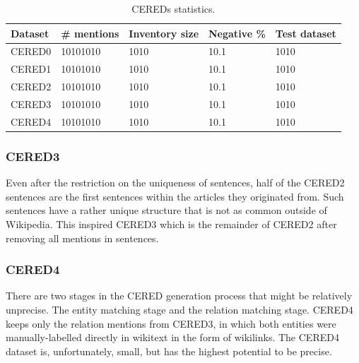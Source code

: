 \begin{table}

\caption{CEREDs statistics.}

\label{table01:S10T8}

\begin{tabular}{p{} P{2,3cm} P{2,3cm} P{2,3cm} P{2,3cm} }

\hline
Dataset & \# mentions & Inventory size & Negative \% & Test dataset\\
\hline
\hline
CERED0 & 10101010 & 1010 & 10.1 & 1010\\
CERED1 & 10101010 & 1010 & 10.1 & 1010\\
CERED2 & 10101010 & 1010 & 10.1 & 1010\\
CERED3 & 10101010 & 1010 & 10.1 & 1010\\
CERED4 & 10101010 & 1010 & 10.1 & 1010\\
\hline


\end{tabular}

\end{table}

 





\subsubsection{CERED3}
Even after the restriction on the uniqueness of sentences, half of the CERED2 sentences are the first sentences within the articles they originated from. Such sentences have a rather unique structure that is not as common outside of Wikipedia. This inspired CERED3 which is the remainder of CERED2 after removing all mentions in  sentences.

\subsubsection{CERED4}
There are two stages in the CERED generation process that might be relatively unprecise. The entity matching stage and the relation matching stage. CERED4 keeps only the relation mentions from CERED3, in which both entities were manually-labelled directly in wikitext in the form of wikilinks. The CERED4 dataset is, unfortunately, small, but has the highest potential to be precise.

